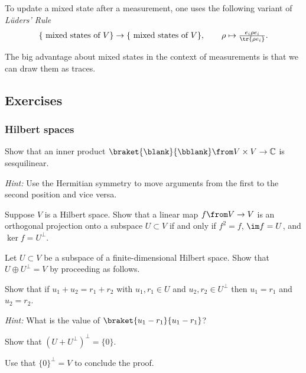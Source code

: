\documentclass[a4paper,oneside, 12pt]{amsart}
\begin{document}
To update a mixed state after a measurement, one uses the following variant of \emph{Lüders' Rule }
\begin{equation*}
  \{\text{ mixed states of } V\} \to\{ \text{ mixed states of } V\}, \qquad
  \rho \mapsto \tfrac{e_{i}\rho e_{i}}{\tr{\rho e_{i}}}.
\end{equation*}


The big advantage about mixed states in the context of  measurements is that we can draw them as traces.
\begin{equation*}
\end{equation*}

\cleardoublepage
\subsection{Exercises}\label{sec:basics-exercises}

\subsubsection*{Hilbert spaces}

\begin{exercise}\label{exe:inner-product-is-sesquilinear}
  Show that an inner product \(\braket{\blank}{\bblank} \from V\times V \to \mathbb{C}\) is sesquilinear.

  \textit{Hint:} Use the Hermitian symmetry to move arguments from the first to the second position and vice versa.
\end{exercise}

\begin{exercise}\label{exe:orthogonal-proj-equivalent}
  Suppose \(V\) is a Hilbert space.
  Show that a linear map \(f \from V\to V\) is an orthogonal projection onto a subspace \(U \subset V\) if and only if \(f^{2} = f\), \(\im f = U\), and \(\ker f = U^{\perp}\).
\end{exercise}

\begin{exercise}\label{exe:orth-complement-direct-sum}
  Let \(U\subset V\) be a subspace of a finite-dimensional Hilbert space.
  Show that \(U\oplus U^{\perp} = V\) by proceeding as follows.
  \begin{thmlist}
    \item Show that if \(u_{1} + u_{2} = r_{1} + r_{2} \) with \(u_{1}, r_{1} \in U\) and \(u_{2}, r_{2} \in U^{\perp}\) then \(u_{1} = r_{1}\) and \(u_{2} = r_{2}\).

    \textit{Hint:} What is the value of \(\braket{u_{1}-r_{1}}{u_{1} -r_{1}}\)?
    \item Show that \((U+ U^{\perp})^{\perp} =\{0\}\).
    \item Use that \(\{0\}^{\perp} = V\) to conclude the proof.
  \end{thmlist}
\end{exercise}
\end{document}
